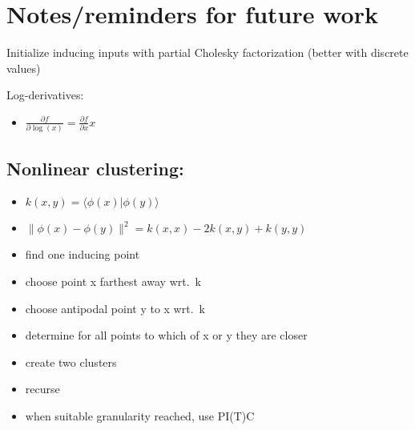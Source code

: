 \documentclass[10pt]{article}
\begin{document}
\newpage

\section{Notes/reminders for future work}

Initialize inducing inputs with partial Cholesky factorization
(better with discrete values)

Log-derivatives:

\begin{itemize}
\item $\tfrac{\partial f}{\partial \log(x)} = \tfrac{\partial f}{\partial x} x$
\end{itemize}

\subsection{Nonlinear clustering:}

\begin{itemize}
\item $k(x, y) = \langle \phi(x) | \phi(y) \rangle$
\item $\|\phi(x) - \phi(y)\|^2 = k(x,x)-2k(x,y)+k(y,y)$
\item find one inducing point
\item choose point x farthest away wrt.\ k
\item choose antipodal point y to x wrt.\ k
\item determine for all points to which of x or y they are closer
\item create two clusters
\item recurse
\item when suitable granularity reached, use PI(T)C
\end{itemize}



 
\end{document}
